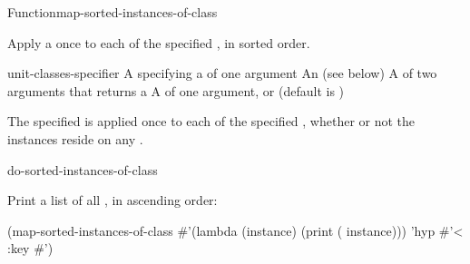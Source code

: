 \documentclass[10pt,twoside,english,pdftex]{article}
\begin{document}

\begin{functiondoc}{Function}{map-sorted-instances-of-class}%
  {
    }
%
%

\fnsyntax

\fnpurpose Apply a  once to each 
of the specified , in sorted order.

\fnpackage {}

\fnmodule {}

\fnargs
\begin{args}{unit-classes-specifier}
\arg[function] A  specifying a
  of one argument
 An 
(see below)
\arg[predicate] A  of two arguments that returns a
\arg[key] A  of one argument, or \nil{} (default is \nil)
\end{args}

\fndsyntax
\W\supp\tabletop
\unitclassesspec
\subclassingspec

\fndescription  The specified  is applied once to each
 of the specified , whether
or not the instances reside on any .

\begin{alsos}{do-sorted-instances-of-class}
\end{alsos}

\fnexample
Print a list of all  , in ascending order:
%
\W\supp
\begin{example}
  (map-sorted-instances-of-class 
     #'(lambda (instance)
         (print ( instance)))
     'hyp #'< :key #')
\end{example} 

\end{functiondoc}

\end{document}
